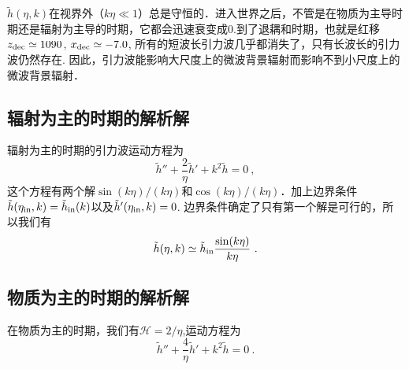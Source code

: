 $\tilde h(\eta,k)$在视界外（$k\eta\ll 1$）总是守恒的．进入世界之后，不管是在物质为主导时期还是辐射为主导的时期，它都会迅速衰变成0.到了退耦和时期，也就是红移$z_{\rm dec} \simeq 1090$, $x_{\rm dec}\simeq -7.0$, 所有的短波长引力波几乎都消失了，只有长波长的引力波仍然存在. 因此，引力波能影响大尺度上的微波背景辐射而影响不到小尺度上的微波背景辐射．

\subsection{辐射为主的时期的解析解}
辐射为主的时期的引力波运动方程为
\begin{equation}
\tilde h'' + \frac{2}{\eta} \tilde h' + k^2 \tilde h = 0~,
\end{equation}
这个方程有两个解$\sin(k\eta)/(k\eta)$和$\cos(k\eta)/(k\eta)$．加上边界条件$\tilde h(\eta_{\rm in},k) = \tilde h_{\rm in} (k)$以及$\tilde h'(\eta_{\rm in},k) = 0$. 边界条件确定了只有第一个解是可行的，所以我们有
\begin{equation}
\tilde h (\eta, k) \simeq \tilde h_{\rm in} \frac{\sin(k\eta)}{k\eta} ~.
\end{equation}

\subsection{物质为主的时期的解析解}
在物质为主的时期，我们有$\mathcal H = 2/\eta$,运动方程为
\begin{equation}
\tilde h'' + \frac{4}{\eta} \tilde h' + k^2 \tilde h = 0~.
\end{equation}



















